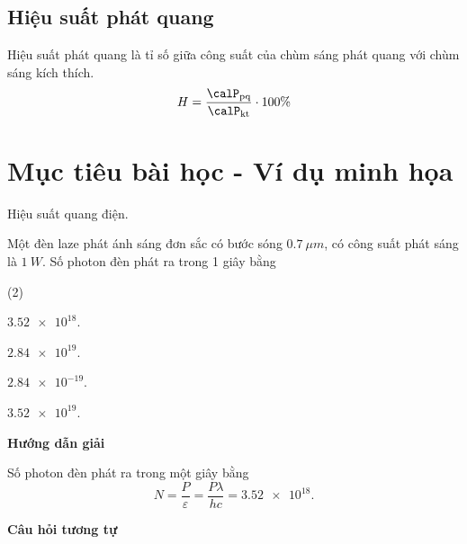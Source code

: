 \subsection{Hiệu suất phát quang}
Hiệu suất phát quang là tỉ số giữa công suất của chùm sáng phát quang với chùm sáng kích thích.
\begin{equation}
	H = \dfrac{\calP_\text{pq}}{\calP_\text{kt}} \cdot 100 \%
\end{equation}

\section{Mục tiêu bài học - Ví dụ minh họa}

\begin{dang}{Hiệu suất quang điện.}
	
	
	{
		Một đèn laze phát ánh sáng đơn sắc có bước sóng $ \SI{0,7}{\mu m} $, có công suất phát sáng là $ \SI{1}{W} $. Số photon đèn phát ra trong 1 giây bằng
		\begin{mcq}(2)
			\item $ \num{3,52e18} $. 
			\item $ \num{2,84e19} $.
			\item $ \num{2,84e-19} $. 
			\item $ \num{3,52e19} $. 
		\end{mcq}
	}
	{
		\begin{center}
			\textbf{Hướng dẫn giải}
		\end{center}
		Số photon đèn phát ra trong một giây bằng
		$$
		N = \dfrac{P}{\varepsilon} = \dfrac{P \lambda}{hc} = \num{3,52e18}.
		$$	
		\begin{center}
			\textbf{Câu hỏi tương tự}
		\end{center}
		
}
\end{dang}

